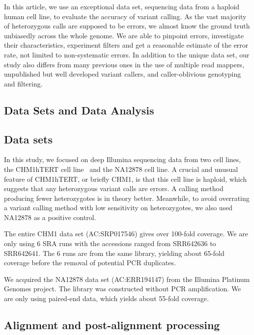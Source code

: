 \documentclass{bioinfo}
\begin{document}
In this article, we use an exceptional data set, sequencing data from a
haploid human cell line, to evaluate the accuracy of variant calling. As the
vast majority of heterozygous calls are supposed to be errors, we almost know
the ground truth unbiasedly across the whole genome. We are able to pinpoint
errors, investigate their characteristics, experiment filters and get a
reasonable estimate of the error rate, not limited to non-systematic errors. In
addition to the unique data set, our study also differs from many previous ones
in the use of multiple read mappers, unpublished but well developed variant
callers, and caller-oblivious genotyping and filtering.

\begin{methods}
\section{Data Sets and Data Analysis}

\subsection{Data sets}

In this study, we focused on deep Illumina sequencing data from two cell lines,
the CHM1hTERT cell line~\citep{Jacobs:1980aa} and the NA12878 cell line. A
crucial and unusual feature of CHM1hTERT, or briefly CHM1, is that this cell
line is haploid, which suggests that any heterozygous variant calls are errors.
A calling method producing fewer heterozygotes is in theory better. Meanwhile,
to avoid overrating a variant calling method with low sensitivity on
heterozygotes, we also used NA12878 as a positive control.

The entire CHM1 data set (AC:SRP017546) gives over 100-fold coverage. We are
only using 6 SRA runs with the accessions ranged from SRR642636 to SRR642641.
The 6 runs are from the same library, yielding about 65-fold coverage before
the removal of potential PCR duplicates.

We acquired the NA12878 data set (AC:ERR194147) from the Illumina Platinum
Genomes project. The library was constructed without PCR amplification. We are
only using paired-end data, which yields about 55-fold coverage.

\subsection{Alignment and post-alignment processing}


\end{methods}
\end{document}
